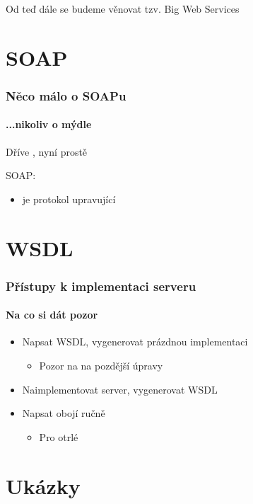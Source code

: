 \documentclass[12pt]{beamer}
\begin{document}
\begin{frame}
  \begin{example}
    Od teď dále se budeme věnovat tzv. Big Web Services
  \end{example}
\end{frame}

\section{SOAP}

\begin{frame}
  \frametitle{Něco málo o SOAPu}
  \framesubtitle{...nikoliv o mýdle}

  Dříve , nyní prostě 

  \begin{block}{SOAP:}
    \begin{itemize}
      \item je protokol upravující
    \end{itemize}
  \end{block}
\end{frame}

\section{WSDL}

\begin{frame}
  \frametitle{Přístupy k implementaci serveru}
  \framesubtitle{Na co si dát pozor}

  \begin{itemize}
    \item Napsat WSDL, vygenerovat prázdnou implementaci
    \begin{itemize}
      \item \alert{Pozor na na pozdější úpravy}
    \end{itemize}
    \item Naimplementovat server, vygenerovat WSDL
    \item Napsat obojí ručně
    \begin{itemize}
      \item Pro otrlé
    \end{itemize}
  \end{itemize}
\end{frame}

\section{Ukázky}
\end{document}

